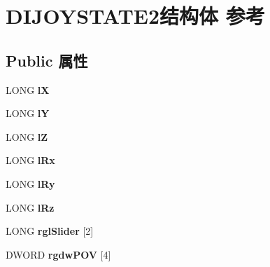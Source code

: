 \hypertarget{struct_d_i_j_o_y_s_t_a_t_e2}{}\section{D\+I\+J\+O\+Y\+S\+T\+A\+T\+E2结构体 参考}
\label{struct_d_i_j_o_y_s_t_a_t_e2}
\subsection*{Public 属性}
\begin{DoxyCompactItemize}
\item 
\mbox{\label{struct_d_i_j_o_y_s_t_a_t_e2_a9ecd12dc69d0036a6f71f20a0c879833}} 
L\+O\+NG {\bfseries lX}
\item 
\mbox{\label{struct_d_i_j_o_y_s_t_a_t_e2_ac8145ea13fa68130278de8efd42c11ae}} 
L\+O\+NG {\bfseries lY}
\item 
\mbox{\label{struct_d_i_j_o_y_s_t_a_t_e2_a4f6e5178a27d85cd1bf6880fc7499974}} 
L\+O\+NG {\bfseries lZ}
\item 
\mbox{\label{struct_d_i_j_o_y_s_t_a_t_e2_a1ef895c8556a7324080a76f0b20bf744}} 
L\+O\+NG {\bfseries l\+Rx}
\item 
\mbox{\label{struct_d_i_j_o_y_s_t_a_t_e2_a08d11d80e53d96e47794f748a2a6f546}} 
L\+O\+NG {\bfseries l\+Ry}
\item 
\mbox{\label{struct_d_i_j_o_y_s_t_a_t_e2_a9668dce790717c3808b78c17f8fc815f}} 
L\+O\+NG {\bfseries l\+Rz}
\item 
\mbox{\label{struct_d_i_j_o_y_s_t_a_t_e2_aa259727328b7e7160dc3d0be6c1b922b}} 
L\+O\+NG {\bfseries rgl\+Slider} \mbox{[}2\mbox{]}
\item 
\mbox{\label{struct_d_i_j_o_y_s_t_a_t_e2_a610bd18d9dd171df8408ea8db7b699c6}} 
D\+W\+O\+RD {\bfseries rgdw\+P\+OV} \mbox{[}4\mbox{]}
\item 
\mbox{\label{struct_d_i_j_o_y_s_t_a_t_e2_aaf4d7e82cbb5ecc5cd9fc19cb8854e10}} 

\end{DoxyCompactItemize}
